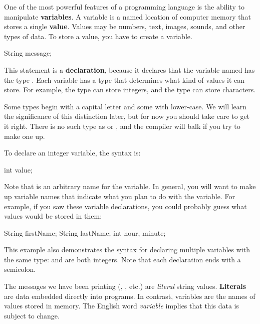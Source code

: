 
One of the most powerful features of a programming language is the ability to manipulate {\bf variables}.
A variable is a named location of computer memory that stores a single {\bf value}.
Values may be numbers, text, images, sounds, and other types of data.
To store a value, you have to create a variable.

\begin{code}
    String message;
\end{code}


This statement is a {\bf declaration}, because it declares that the variable named  has the type .
Each variable has a type that determines what kind of values it can store.
For example, the  type can store integers, and the  type can store characters.

Some types begin with a capital letter and some with lower-case.
We will learn the significance of this distinction later, but for now you should take care to get it right.
There is no such type as  or , and the compiler will balk if you try to make one up.

To declare an integer variable, the syntax is:

\begin{code}
    int value;
\end{code}

Note that  is an arbitrary name for the variable.
In general, you will want to make up variable names that indicate what you plan to do with the variable.
For example, if you saw these variable declarations, you could probably guess what values would be stored in them:

\begin{code}
    String firstName;
    String lastName;
    int hour, minute;
\end{code}

This example also demonstrates the syntax for declaring multiple variables with the same type:  and  are both integers. Note that each declaration ends with a semicolon.


The messages we have been printing (, , etc.) are {\em literal} string values. {\bf Literals} are data embedded directly into programs. In contrast, variables are the names of values stored in memory. The English word {\em variable} implies that this data is subject to change.


